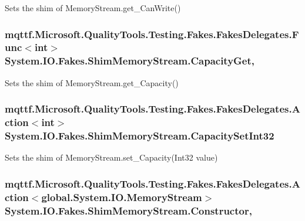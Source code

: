 Sets the shim of Memory\-Stream.\-get\-\_\-\-Can\-Write()

\hypertarget{class_system_1_1_i_o_1_1_fakes_1_1_shim_memory_stream_ad947051288717cc6b36d7ff416736762}{
\subsubsection[{Capacity\-Get}]{\setlength{\rightskip}{0pt plus 5cm}mqttf.\-Microsoft.\-Quality\-Tools.\-Testing.\-Fakes.\-Fakes\-Delegates.\-Func$<$int$>$ System.\-I\-O.\-Fakes.\-Shim\-Memory\-Stream.\-Capacity\-Get\hspace{0.3cm}{\ttfamily [get]}, {\ttfamily [set]}}}\label{class_system_1_1_i_o_1_1_fakes_1_1_shim_memory_stream_ad947051288717cc6b36d7ff416736762}


Sets the shim of Memory\-Stream.\-get\-\_\-\-Capacity()

\hypertarget{class_system_1_1_i_o_1_1_fakes_1_1_shim_memory_stream_a4b28019d3a21eb2e5d5d1056d5659d48}{
\subsubsection[{Capacity\-Set\-Int32}]{\setlength{\rightskip}{0pt plus 5cm}mqttf.\-Microsoft.\-Quality\-Tools.\-Testing.\-Fakes.\-Fakes\-Delegates.\-Action$<$int$>$ System.\-I\-O.\-Fakes.\-Shim\-Memory\-Stream.\-Capacity\-Set\-Int32\hspace{0.3cm}{\ttfamily [set]}}}\label{class_system_1_1_i_o_1_1_fakes_1_1_shim_memory_stream_a4b28019d3a21eb2e5d5d1056d5659d48}


Sets the shim of Memory\-Stream.\-set\-\_\-\-Capacity(\-Int32 value)

\hypertarget{class_system_1_1_i_o_1_1_fakes_1_1_shim_memory_stream_aec9b36487e6846875d3b458872b95ded}{
\subsubsection[{Constructor}]{\setlength{\rightskip}{0pt plus 5cm}mqttf.\-Microsoft.\-Quality\-Tools.\-Testing.\-Fakes.\-Fakes\-Delegates.\-Action$<$global.\-System.\-I\-O.\-Memory\-Stream$>$ System.\-I\-O.\-Fakes.\-Shim\-Memory\-Stream.\-Constructor\hspace{0.3cm}{\ttfamily [static]}, {\ttfamily [set]}}}\label{class_system_1_1_i_o_1_1_fakes_1_1_shim_memory_stream_aec9b36487e6846875d3b458872b95ded}


